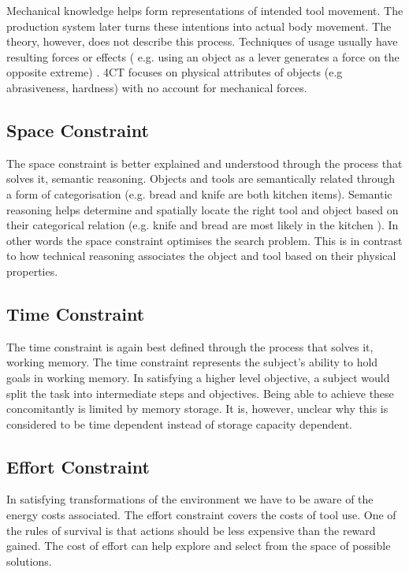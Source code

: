 \documentclass[11]{article}
\begin{document}
Mechanical knowledge helps form representations of intended tool movement. The  production system later turns these intentions into actual body movement. The theory, however, does not describe this process. Techniques of usage usually have resulting forces or effects ( e.g. using an object as a lever generates a force on the opposite extreme) . 4CT focuses on physical attributes of objects (e.g abrasiveness, hardness) with no account for mechanical forces.

\pagebreak

\subsection{Space Constraint}
The space constraint is better explained and understood through the process that solves it, semantic reasoning. Objects and tools are semantically related through a form of categorisation (e.g. bread and knife are both kitchen items). Semantic reasoning helps determine and spatially locate the right tool and object based on their categorical relation (e.g. knife and bread are most likely in the kitchen ). In other words the space constraint optimises the search problem. This is in contrast to how technical reasoning associates the object and tool based on their physical properties.

\subsection{Time Constraint}
The time constraint is again best defined through the process that solves it, working memory. The time constraint represents the subject's ability to hold goals in working memory. In satisfying a higher level objective, a subject would split the task into intermediate steps and objectives. Being able to achieve these concomitantly is limited by memory storage. It is, however, unclear why this is considered to be time dependent instead of storage capacity dependent. 

\subsection{Effort Constraint}
In satisfying transformations of the environment we have to be aware of the energy costs associated. The effort constraint covers the costs of tool use. One of the rules of survival is that actions should be less expensive than the reward gained\cite{profet2006}. The cost of effort can help explore and select from the space of possible solutions. 
\end{document}
